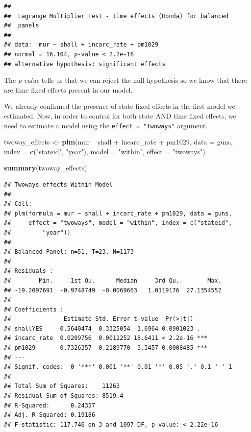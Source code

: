 \documentclass[]{article}
\newenvironment{Shaded}{\begin{snugshade}}{\end{snugshade}}
\newcommand{\KeywordTok}[1]{\textcolor[rgb]{0.13,0.29,0.53}{\textbf{{#1}}}}
\newcommand{\DataTypeTok}[1]{\textcolor[rgb]{0.13,0.29,0.53}{{#1}}}
\newcommand{\StringTok}[1]{\textcolor[rgb]{0.31,0.60,0.02}{{#1}}}
\newcommand{\NormalTok}[1]{{#1}}
\theoremstyle{definition}
\theoremstyle{definition}
\theoremstyle{remark}
\begin{document}
\begin{verbatim}
## 
##  Lagrange Multiplier Test - time effects (Honda) for balanced
##  panels
## 
## data:  mur ~ shall + incarc_rate + pm1029
## normal = 16.104, p-value < 2.2e-16
## alternative hypothesis: significant effects
\end{verbatim}

The \emph{p-value} tells us that we can reject the null hypothesis so we
know that there are time fixed effects present in our model.

We already confirmed the presence of state fixed effects in the first
model we estimated. Now, in order to control for both state AND time
fixed effects, we need to estimate a model using the
\texttt{effect\ =\ "twoways"} argument.

\begin{Shaded}
\begin{Highlighting}[]
\NormalTok{twoway_effects <-}\StringTok{ }\KeywordTok{plm}\NormalTok{(mur ~}\StringTok{ }\NormalTok{shall +}\StringTok{ }\NormalTok{incarc_rate +}\StringTok{ }\NormalTok{pm1029, }
                      \DataTypeTok{data =} \NormalTok{guns, }
                      \DataTypeTok{index =} \KeywordTok{c}\NormalTok{(}\StringTok{"stateid"}\NormalTok{, }\StringTok{"year"}\NormalTok{), }
                      \DataTypeTok{model =} \StringTok{"within"}\NormalTok{, }
                      \DataTypeTok{effect =} \StringTok{"twoways"}\NormalTok{)}

\KeywordTok{summary}\NormalTok{(twoway_effects)}
\end{Highlighting}
\end{Shaded}

\begin{verbatim}
## Twoways effects Within Model
## 
## Call:
## plm(formula = mur ~ shall + incarc_rate + pm1029, data = guns, 
##     effect = "twoways", model = "within", index = c("stateid", 
##         "year"))
## 
## Balanced Panel: n=51, T=23, N=1173
## 
## Residuals :
##        Min.     1st Qu.      Median     3rd Qu.        Max. 
## -19.2097691  -0.9748749  -0.0069663   1.0119176  27.1354552 
## 
## Coefficients :
##               Estimate Std. Error t-value  Pr(>|t|)    
## shallYES    -0.5640474  0.3325054 -1.6964 0.0901023 .  
## incarc_rate  0.0209756  0.0011252 18.6411 < 2.2e-16 ***
## pm1029       0.7326357  0.2189770  3.3457 0.0008485 ***
## ---
## Signif. codes:  0 '***' 0.001 '**' 0.01 '*' 0.05 '.' 0.1 ' ' 1
## 
## Total Sum of Squares:    11263
## Residual Sum of Squares: 8519.4
## R-Squared:      0.24357
## Adj. R-Squared: 0.19186
## F-statistic: 117.746 on 3 and 1097 DF, p-value: < 2.22e-16
\end{verbatim}
\end{document}
